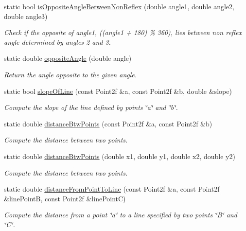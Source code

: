 \begin{DoxyCompactItemize}
static bool \hyperlink{classmultiscale_1_1Geometry2D_a28d74085708bba7fa68fbea05d0d51ad}{is\-Opposite\-Angle\-Between\-Non\-Reflex} (double angle1, double angle2, double angle3)
\begin{DoxyCompactList}\small\item\em \-Check if the opposite of angle1, ((angle1 + 180) \% 360), lies between non reflex angle determined by angles 2 and 3. \end{DoxyCompactList}\item 
static double \hyperlink{classmultiscale_1_1Geometry2D_a3bb85fa2797ba25765f0f57786cb33ef}{opposite\-Angle} (double angle)
\begin{DoxyCompactList}\small\item\em \-Return the angle opposite to the given angle. \end{DoxyCompactList}\item 
static bool \hyperlink{classmultiscale_1_1Geometry2D_a1219ac10c3647d43c5af77dc5bc574a2}{slope\-Of\-Line} (const \-Point2f \&a, const \-Point2f \&b, double \&slope)
\begin{DoxyCompactList}\small\item\em \-Compute the slope of the line defined by points \char`\"{}a\char`\"{} and \char`\"{}b\char`\"{}. \end{DoxyCompactList}\item 
static double \hyperlink{classmultiscale_1_1Geometry2D_a911b35d7abde99988bb4b43f00d6be72}{distance\-Btw\-Points} (const \-Point2f \&a, const \-Point2f \&b)
\begin{DoxyCompactList}\small\item\em \-Compute the distance between two points. \end{DoxyCompactList}\item 
static double \hyperlink{classmultiscale_1_1Geometry2D_a0b01b51c41789623f2cd7a0a2a66f462}{distance\-Btw\-Points} (double x1, double y1, double x2, double y2)
\begin{DoxyCompactList}\small\item\em \-Compute the distance between two points. \end{DoxyCompactList}\item 
static double \hyperlink{classmultiscale_1_1Geometry2D_ae6c0f66accf4ecf31b0fd96437371626}{distance\-From\-Point\-To\-Line} (const \-Point2f \&a, const \-Point2f \&line\-Point\-B, const \-Point2f \&line\-Point\-C)
\begin{DoxyCompactList}\small\item\em \-Compute the distance from a point \char`\"{}a\char`\"{} to a line specified by two points \char`\"{}\-B\char`\"{} and \char`\"{}\-C\char`\"{}. \end{DoxyCompactList}\item 

\end{DoxyCompactItemize}
